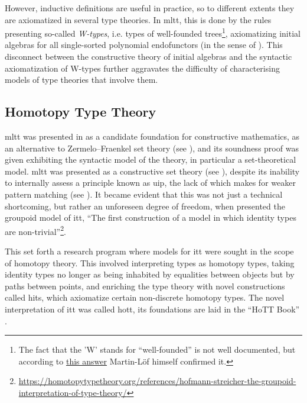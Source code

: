 \documentclass[a4paper]{article}
\begin{document}
However, inductive definitions are useful in practice, so to different extents they are axiomatized in several type theories. In \gls{mltt}, this is done by the rules presenting so-called \textit{W-types}, i.e. types of well-founded trees\footnote{The fact that the 'W' stands for ``well-founded'' is not well documented, but according to \href{https://mathoverflow.net/questions/402435/why-are-w-types-called-w}{this answer} Martin-Löf himself confirmed it.}, axiomatizing initial algebras for all single-sorted polynomial endofunctors (in the sense of \cite{Abbott2005}). This disconnect between the constructive theory of initial algebras and the syntactic axiomatization of W-types further aggravates the difficulty of characterising models of type theories that involve them.

\subsection{Homotopy Type Theory}

\Gls{mltt} was presented in \cite{MartinLoef1998} as a candidate foundation for constructive mathematics, as an alternative to Zermelo–Fraenkel set theory (see \cite[Introduction]{MartinLoef1998}), and its soundness proof was given exhibiting the syntactic model of the theory, in particular a set-theoretical model. \Gls{mltt} was presented as a constructive set theory (see \cite{Nordstroem1990}), despite its inability to internally assess a principle known as \gls{uip}, the lack of which makes for weaker pattern matching (see \textcite{Cockx2016}). It became evident that this was not just a technical shortcoming, but rather an unforeseen degree of freedom, when \textcite{Hofmann1998} presented the groupoid model of \gls{itt}, ``The first construction of a model in which identity types are non-trivial''\footnote{\url{https://homotopytypetheory.org/references/hofmann-streicher-the-groupoid-interpretation-of-type-theory/}}.

This set forth a research program where models for \gls{itt} were sought in the scope of homotopy theory. This involved interpreting types as homotopy types, taking identity types no longer as being inhabited by equalities between objects but by paths between points, and enriching the type theory with novel constructions called \glspl{hit}, which axiomatize certain non-discrete homotopy types. The novel interpretation of \gls{itt} was called \gls{hott}, its foundations are laid in the ``HoTT Book'' \cite{UnivalentFoundationsProgram2013}.
\end{document}
